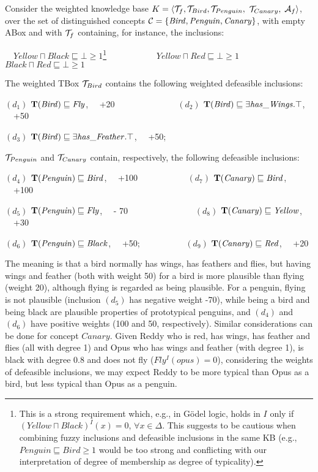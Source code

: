 \documentclass[runningheads]{llncs}
\newcommand{\tip}{{\bf T}}
\begin{document}
\begin{example} \label{exa:Penguin}
Consider the weighted knowledge base $K =\langle {\cal T}_{f},  {\cal T}_{Bird}, {\cal T}_{Penguin},$ $ {\cal T}_{Canary},$ $ {\cal A}_f \rangle$, over the set of distinguished concepts ${\cal C}=\{\mathit{Bird, Penguin, Canary}\}$, with empty ABox 
and with $ {\cal T}_{f}$ containing, for instance, the inclusions:

\noindent
\ \ $\mathit{Yellow \sqcap Black  \sqsubseteq  \bot} \geq 1$\footnote{This is a strong requirement which, e.g., in G\"odel logic, holds in $I$ only if $\mathit{(Yellow \sqcap Black)^I(x)=0 }$, $\forall x\in \Delta$. This suggests to be cautious when combining fuzzy inclusions and defeasible inclusions in the same KB (e.g.,  $\mathit{Penguin  \sqsubseteq  Bird \geq 1}$ would be too strong and conflicting with our interpretation of degree of membership as degree of typicality).}
 \ \ \ \ \ \ \ \ \ \ \   $\mathit{Yellow \sqcap Red  \sqsubseteq  \bot \geq 1}$   \ \ \ \ \ \ \ \ \ \  $\mathit{Black \sqcap Red  \sqsubseteq  \bot \geq 1}$ 


\noindent
The weighted TBox ${\cal T}_{Bird} $ 
contains the following weighted defeasible inclusions: 

$(d_1)$ $\mathit{\tip(Bird) \sqsubseteq Fly}$, \ \  +20  \ \ \ \ \ \ \ \ \  \ \ \ \ \   $(d_2)$ $\mathit{\tip(Bird) \sqsubseteq \exists has\_Wings. \top}$, \ \ +50

$(d_3)$ $\mathit{\tip(Bird) \sqsubseteq  \exists has\_Feather.\top}$, \ \ +50;

\noindent
${\cal T}_{Penguin}$ and  ${\cal T}_{Canary}$ contain, respectively, the following defeasible inclusions:

$(d_4)$ $\mathit{\tip(Penguin) \sqsubseteq Bird}$, \ \ +100 \ \ \ \ \ \ \ \ \ \ \ $(d_7)$ $\mathit{\tip(Canary) \sqsubseteq Bird}$, \ \ +100

$(d_5)$ $\mathit{\tip(Penguin) \sqsubseteq  Fly}$, \ \ - 70   \ \ \ \ \ \ \ \ \ \ \ \ \ \ \  $(d_8)$ $\mathit{\tip(Canary) \sqsubseteq Yellow}$, \ \  +30

$(d_6)$ $\mathit{\tip(Penguin) \sqsubseteq Black}$, \ \  +50; \ \ \ \ \ \ \ \ \ \ $(d_9)$ $\mathit{\tip(Canary) \sqsubseteq Red}$, \ \  +20


\noindent
 The meaning is that a bird normally has wings, has feathers and flies, but having wings and feather (both with weight 50)  for a bird is more plausible than flying (weight 20), although flying is regarded as being plausible. For a penguin, flying is not plausible (inclusion $(d_5)$ has negative weight -70), while being a bird and being black are plausible properties of prototypical penguins, and $(d_4)$ and $(d_6)$ have positive weights (100 and 50, respectively). Similar considerations can be done for concept $\mathit{Canary}$. Given Reddy who is red, has wings, has feather and flies (all with degree 1) and Opus who has wings and feather (with degree 1), is black with degree 0.8 and does not fly ($\mathit{Fly^I(opus) = 0}$), considering the weights of defeasible inclusions, we may expect Reddy to be more typical than Opus as a bird, but less typical than Opus as a penguin. 
 
 \end{example}
\end{document}

